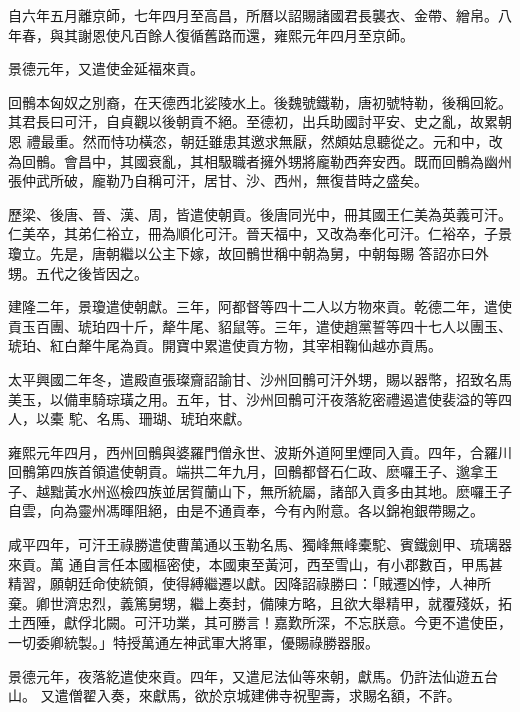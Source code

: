 \begin{pinyinscope}
 自六年五月離京師，七年四月至高昌，所曆以詔賜諸國君長襲衣、金帶、繒帛。八年春，與其謝恩使凡百餘人復循舊路而還，雍熙元年四月至京師。



 景德元年，又遣使金延福來貢。



 回鶻本匈奴之別裔，在天德西北娑陵水上。後魏號鐵勒，唐初號特勒，後稱回紇。其君長曰可汗，自貞觀以後朝貢不絕。至德初，出兵助國討平安、史之亂，故累朝恩
 禮最重。然而恃功橫恣，朝廷雖患其邀求無厭，然頗姑息聽從之。元和中，改為回鶻。會昌中，其國衰亂，其相馺職者擁外甥將龐勒西奔安西。既而回鶻為幽州張仲武所破，龐勒乃自稱可汗，居甘、沙、西州，無復昔時之盛矣。



 歷梁、後唐、晉、漢、周，皆遣使朝貢。後唐同光中，冊其國王仁美為英義可汗。仁美卒，其弟仁裕立，冊為順化可汗。晉天福中，又改為奉化可汗。仁裕卒，子景瓊立。先是，唐朝繼以公主下嫁，故回鶻世稱中朝為舅，中朝每賜
 答詔亦曰外甥。五代之後皆因之。



 建隆二年，景瓊遣使朝獻。三年，阿都督等四十二人以方物來貢。乾德二年，遣使貢玉百團、琥珀四十斤，犛牛尾、貂鼠等。三年，遣使趙黨誓等四十七人以團玉、琥珀、紅白犛牛尾為貢。開寶中累遣使貢方物，其宰相鞠仙越亦貢馬。



 太平興國二年冬，遣殿直張璨齎詔諭甘、沙州回鶻可汗外甥，賜以器幣，招致名馬美玉，以備車騎琮璜之用。五年，甘、沙州回鶻可汗夜落紇密禮遏遣使裴溢的等四人，以橐
 駝、名馬、珊瑚、琥珀來獻。



 雍熙元年四月，西州回鶻與婆羅門僧永世、波斯外道阿里煙同入貢。四年，合羅川回鶻第四族首領遣使朝貢。端拱二年九月，回鶻都督石仁政、麽囉王子、邈拿王子、越黜黃水州巡檢四族並居賀蘭山下，無所統屬，諸部入貢多由其地。麽囉王子自雲，向為靈州馮暉阻絕，由是不通貢奉，今有內附意。各以錦袍銀帶賜之。



 咸平四年，可汗王祿勝遣使曹萬通以玉勒名馬、獨峰無峰橐駝、賓鐵劍甲、琉璃器來貢。萬
 通自言任本國樞密使，本國東至黃河，西至雪山，有小郡數百，甲馬甚精習，願朝廷命使統領，使得縛繼遷以獻。因降詔祿勝曰：「賊遷凶悖，人神所棄。卿世濟忠烈，義篤舅甥，繼上奏封，備陳方略，且欲大舉精甲，就覆殘妖，拓土西陲，獻俘北闕。可汗功業，其可勝言！嘉歎所深，不忘朕意。今更不遣使臣，一切委卿統製。」特授萬通左神武軍大將軍，優賜祿勝器服。



 景德元年，夜落紇遣使來貢。四年，又遣尼法仙等來朝，獻馬。仍許法仙遊五台山。
 又遣僧翟入奏，來獻馬，欲於京城建佛寺祝聖壽，求賜名額，不許。




\end{pinyinscope}
